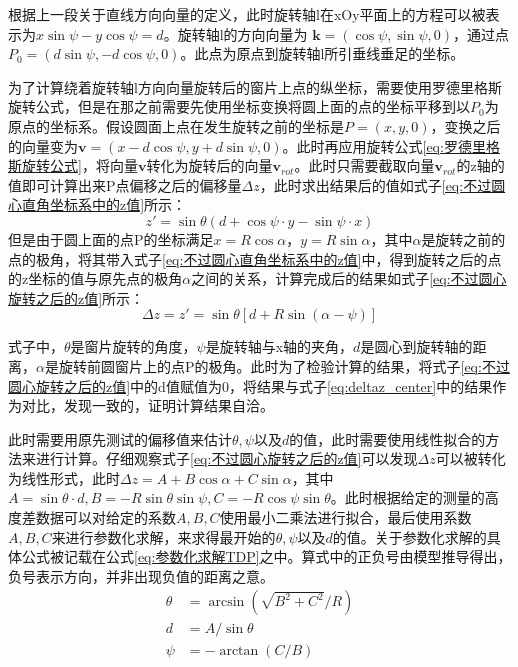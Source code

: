 \documentclass[master]{thesis-uestc}
\begin{document}
根据上一段关于直线方向向量的定义，此时旋转轴l在xOy平面上的方程可以被表示为\(x \sin \psi - y \cos \psi = d\)。旋转轴l的方向向量为 \(\mathbf{k} = (\cos \psi, \sin \psi, 0)\)，通过点 \(P_0 = (d \sin\psi, -d\cos\psi , 0)\)。此点为原点到旋转轴l所引垂线垂足的坐标。

为了计算绕着旋转轴l方向向量旋转后的窗片上点的纵坐标，需要使用罗德里格斯旋转公式，但是在那之前需要先使用坐标变换将圆上面的点的坐标平移到以\(P_0\)为原点的坐标系。假设圆面上点在发生旋转之前的坐标是\(P = (x,y,0)\)，变换之后的向量变为\(\mathbf{v} = (x - d\cos\psi, y + d\sin\psi, 0)\)。此时再应用旋转公式\ref{eq:罗德里格斯旋转公式}，将向量\(\mathbf{v}\)转化为旋转后的向量\(\mathbf{v}_{rot}\)。此时只需要截取向量\(\mathbf{v}_{rot}\)的z轴的值即可计算出来P点偏移之后的偏移量\(\Delta z\)，此时求出结果后的值如式子\ref{eq:不过圆心直角坐标系中的z值}所示：
\begin{equation}\label{eq:不过圆心直角坐标系中的z值}
    z' = \sin \theta \left(d + \cos\psi \cdot y - \sin\psi \cdot x \right)
\end{equation}
但是由于圆上面的点P的坐标满足\(x = R\cos\alpha\)，\(y = R\sin\alpha\)，其中\(\alpha\)是旋转之前的点的极角，将其带入式子\ref{eq:不过圆心直角坐标系中的z值}中，得到旋转之后的点的z坐标的值与原先点的极角\(\alpha\)之间的关系，计算完成后的结果如式子\ref{eq:不过圆心旋转之后的z值}所示：
\begin{equation}\label{eq:不过圆心旋转之后的z值}
    \Delta z = z' = \sin \theta \left[d+R \sin (\alpha -\psi )\right]
\end{equation}

式子中，\(\theta\)是窗片旋转的角度，\(\psi\)是旋转轴与x轴的夹角，\(d\)是圆心到旋转轴的距离，\(\alpha\)是旋转前圆窗片上的点P的极角。此时为了检验计算的结果，将式子\ref{eq:不过圆心旋转之后的z值}中的d值赋值为0，将结果与式子\ref{eq:deltaz_center}中的结果作为对比，发现一致的，证明计算结果自洽。

此时需要用原先测试的偏移值来估计\(\theta, \psi\)以及\(d\)的值，此时需要使用线性拟合的方法来进行计算。仔细观察式子\ref{eq:不过圆心旋转之后的z值}可以发现\(\Delta z\)可以被转化为线性形式，此时\(\Delta z =A+B \cos \alpha +C \sin \alpha \)，其中\(A = \sin \theta \cdot d, B = -R \sin \theta \sin \psi, C = -R \cos \psi \sin \theta \)。此时根据给定的测量的高度差数据可以对给定的系数\(A, B, C\)使用最小二乘法进行拟合，最后使用系数\(A, B, C\)来进行参数化求解，来求得最开始的\(\theta, \psi\)以及\(d\)的值。关于参数化求解的具体公式被记载在公式\ref{eq:参数化求解TDP}之中。算式中的正负号由模型推导得出，负号表示方向，并非出现负值的距离之意。
\begin{subequations}\label{eq:参数化求解TDP}
    \begin{align}
        \theta &= \arcsin(\sqrt{B^2 + C^2}/R)  \label{eq:sin_theta}\\
        d &= A / \sin\theta  \\
        \psi &= - \arctan(C/B) 
    \end{align}
\end{subequations}
\end{document}
